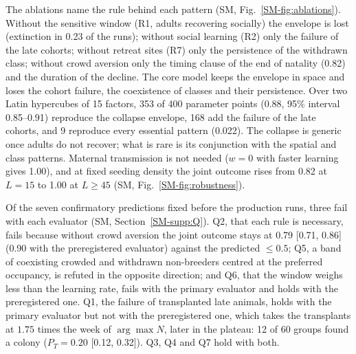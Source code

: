 The ablations name the rule behind each pattern (SM, Fig.~\ref{SM-fig:ablations}). Without the sensitive window (R1,
adults recovering socially) the envelope is lost (extinction in 0.23 of the runs); without social learning (R2) only
the failure of the late cohorts; without retreat sites (R7) only the persistence of the withdrawn class; without crowd
aversion only the timing clause of the end of natality (0.82) and the duration of the decline. The core model keeps
the envelope in space and loses the cohort failure, the coexistence of classes and their persistence. Over two Latin
hypercubes of 15 factors, 353 of 400 parameter points (0.88, 95\% interval 0.85--0.91) reproduce the collapse
envelope, 168 add the failure of the late cohorts, and 9 reproduce every essential pattern (0.022). The collapse is
generic once adults do not recover; what is rare is its conjunction with the spatial and class patterns. Maternal
transmission is not needed ($w=0$ with faster learning gives 1.00), and at fixed seeding density the joint outcome
rises from 0.82 at $L=15$ to 1.00 at $L\ge45$ (SM, Fig.~\ref{SM-fig:robustness}).

Of the seven confirmatory predictions fixed before the production runs, three fail with each evaluator (SM,
Section~\ref{SM-supp:Q}). Q2, that each rule is necessary, fails because without crowd aversion the joint outcome
stays at 0.79 [0.71, 0.86] (0.90 with the preregistered evaluator) against the predicted $\le0.5$; Q5, a band of
coexisting crowded and withdrawn non-breeders centred at the preferred occupancy, is refuted in the opposite
direction; and Q6, that the window weighs less than the learning rate, fails with the primary evaluator and holds
with the preregistered one. Q1, the failure of transplanted late animals, holds with the primary evaluator but not
with the preregistered one, which takes the transplants at $1.75$ times the week of $\arg\max N$, later in the
plateau: 12 of 60 groups found a colony ($P_T=0.20$ [0.12, 0.32]). Q3, Q4 and Q7 hold with both.


